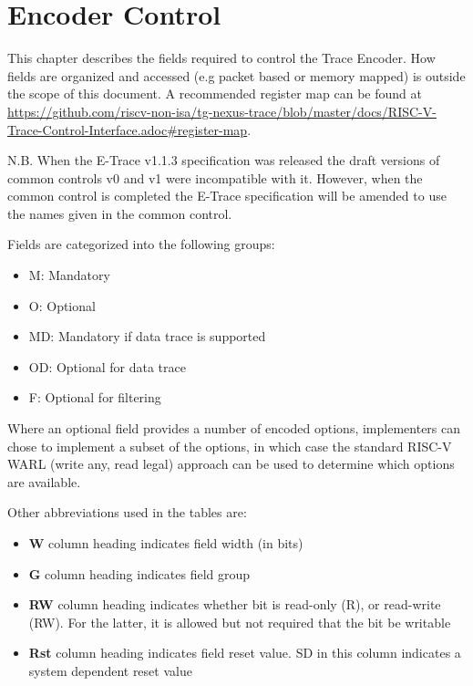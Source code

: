 \chapter{Encoder Control} \label{encoderControl}

This chapter describes the fields required to control the Trace Encoder.  
How fields are organized and accessed (e.g packet based or memory mapped) is outside the scope of this document.  
A recommended register map can be found at \href{https://github.com/riscv-non-isa/tg-nexus-trace/blob/master/docs/RISC-V-Trace-Control-Interface.adoc\#register-map}
{https://github.com/riscv-non-isa/tg-nexus-trace/blob/master/docs/RISC-V-Trace-Control-Interface.adoc\#register-map}.

N.B. When the E-Trace v1.1.3 specification was released the draft
versions of common controls v0 and v1 were incompatible with
it. However, when the common control is completed the E-Trace
specification will be amended to use the names given in the common
control.

Fields are categorized into the following groups:

\begin{itemize}
  \item M: Mandatory
  \item O: Optional
  \item MD: Mandatory if data trace is supported
  \item OD: Optional for data trace
  \item F: Optional for filtering
\end{itemize}

Where an optional field provides a number of encoded options, implementers can chose to implement a subset of the options, 
in which case the standard RISC-V WARL (write any, read legal) approach can be used to determine which options are available.

Other abbreviations used in the tables are:
\begin{itemize}
  \item \textbf{W} column heading indicates field width (in bits)
  \item \textbf{G} column heading indicates field group
  \item \textbf{RW} column heading indicates whether bit is read-only (R), or read-write (RW).  
    For the latter, it is allowed but not required that the bit be writable
  \item \textbf{Rst} column heading indicates field reset value. SD in this column indicates a system dependent reset value
\end{itemize}

